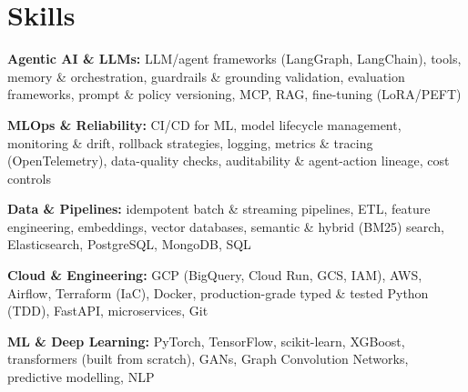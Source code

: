 \documentclass[10pt,a4paper]{article}
\begin{document}
\section{Skills}
\begin{tight}
  \item[\textcolor{accent}{\small$\bullet$}] \textbf{Agentic AI \& LLMs:} LLM/agent frameworks (LangGraph, LangChain), tools, memory \& orchestration, guardrails \& grounding validation, evaluation frameworks, prompt \& policy versioning, MCP, RAG, fine-tuning (LoRA/PEFT)
  \item[\textcolor{accent}{\small$\bullet$}] \textbf{MLOps \& Reliability:} CI/CD for ML, model lifecycle management, monitoring \& drift, rollback strategies, logging, metrics \& tracing (OpenTelemetry), data-quality checks, auditability \& agent-action lineage, cost controls
  \item[\textcolor{accent}{\small$\bullet$}] \textbf{Data \& Pipelines:} idempotent batch \& streaming pipelines, ETL, feature engineering, embeddings, vector databases, semantic \& hybrid (BM25) search, Elasticsearch, PostgreSQL, MongoDB, SQL
  \item[\textcolor{accent}{\small$\bullet$}] \textbf{Cloud \& Engineering:} GCP (BigQuery, Cloud Run, GCS, IAM), AWS, Airflow, Terraform (IaC), Docker, production-grade typed \& tested Python (TDD), FastAPI, microservices, Git
  \item[\textcolor{accent}{\small$\bullet$}] \textbf{ML \& Deep Learning:} PyTorch, TensorFlow, scikit-learn, XGBoost, transformers (built from scratch), GANs, Graph Convolution Networks, predictive modelling, NLP
\end{tight}

\end{document}
